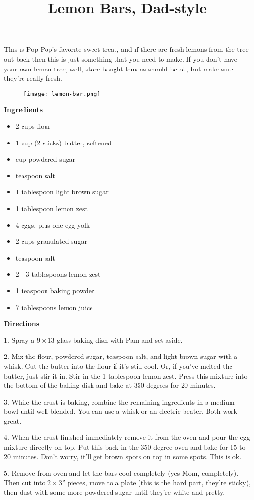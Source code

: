 \documentclass{article}
\title{Lemon Bars, Dad-style}
\begin{document}
This is Pop Pop's favorite sweet treat, and if there are fresh lemons from the tree out
back then this is just something that you need to make. If you don't have your own
lemon tree, well, store-bought lemons should be ok, but make sure they're really fresh.

\begin{figure}
      \centering
      \texttt{[image: lemon-bar.png]}
\end{figure}

\bigskip

\textbf{Ingredients}

\begin{multicols}{2}

      \begin{itemize}
            \item 2 cups flour
            \item 1 cup (2 sticks) butter, softened
            \item {} cup powdered sugar
            \item {} teaspoon salt
            \item 1 tablespoon light brown sugar
            \item 1 tablespoon lemon zest

                  \columnbreak

            \item 4 eggs, plus one egg yolk
            \item 2 cups granulated sugar
            \item {} teaspoon salt
            \item 2 - 3 tablespoons lemon zest
            \item 1 teaspoon baking powder
            \item 7 tablespoons lemon juice
      \end{itemize}

\end{multicols}

\textbf{Directions}

1. Spray a $9\times13$ glass baking dish with Pam and set aside.

2. Mix the flour, powdered sugar,  teaspoon salt, and light brown sugar
with a whisk. Cut the butter into the flour if it's still cool. Or, if you've melted
the butter, just stir it in. Stir in the 1 tablespoon lemon zest. Press this mixture
into the bottom of the baking dish and bake at 350 degrees for 20 minutes.

3. While the crust is baking, combine the remaining ingredients in a medium bowl until
well blended. You can use a whisk or an electric beater. Both work great.

4. When the crust finished immediately remove it from the oven and pour the egg mixture
directly on top. Put this back in the 350 degree oven and bake for 15 to 20 minutes. Don't
worry, it'll get brown spots on top in some spots. This is ok.

5. Remove from oven and let the bars cool completely (yes Mom, completely). Then cut into
$2\times3$'' pieces, move to a plate (this is the hard part, they're sticky), then dust
with some more powdered sugar until they're white and pretty.
\end{document}
